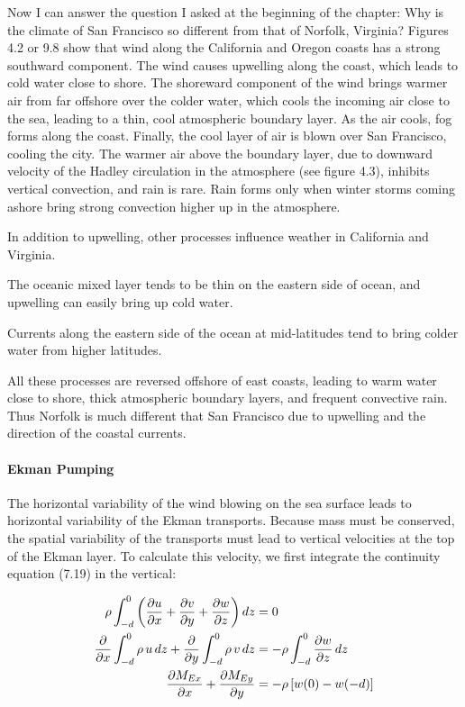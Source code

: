Now I can answer the question I asked at the beginning of the chapter:
Why is the climate of San Francisco so different from that of Norfolk,
Virginia?  Figures 4.2 or 9.8 show that wind along the California and
Oregon coasts has a strong southward component. The wind causes
upwelling along the coast, which leads to
cold water close to shore. The shoreward component of the wind brings
warmer air from far offshore over the colder water, which cools the
incoming air close to the sea, leading to a thin, cool atmospheric
boundary layer. As the air cools, fog forms along the coast. Finally,
the cool layer of air is blown over San Francisco, cooling the
city. The warmer air above the boundary layer, due to downward
velocity of the Hadley circulation in the atmosphere (see figure 4.3),
inhibits vertical convection, and rain is rare. Rain forms only when
winter storms coming ashore bring strong convection higher up in the
atmosphere.

In addition to upwelling, other processes
influence weather in California and Virginia.
\begin{enumerate}
\vitem The oceanic mixed layer
tends to be thin on the eastern side of ocean, and upwelling can
easily bring up cold water.

\vitem Currents along the eastern side of the ocean at mid-latitudes
tend to bring colder water from higher latitudes.
\end{enumerate}
All these processes are reversed offshore of east coasts, leading to
warm water close to shore, thick atmospheric boundary layers, and
frequent convective rain. Thus Norfolk is much different that San
Francisco due to upwelling and the direction
of the coastal currents.

\paragraph{Ekman Pumping}
The horizontal variability of the wind blowing
on the sea surface leads to horizontal variability of the Ekman
transports. Because mass must be conserved, the spatial variability of
the transports must lead to vertical velocities at the top of the
Ekman layer. To calculate this velocity, we first integrate the
continuity equation (7.19) in the vertical:

\begin{equation}
\begin{aligned}
\rho\int_{-d}^0 \left( \frac{\partial{u}}{\partial{x}}+\frac{\partial{v}}{\partial{y}}+\frac{\partial{w}}{\partial{z}} \right) dz &=0
\notag
\\
\frac{\partial}{\partial{x}}\int_{-d}^0 \rho\,u\,dz +\frac{\partial}{\partial{y}}\int_{-d}^0\rho\,v\,dz
&=- \rho \int_{-d}^0 \frac{\partial{w}}{\partial{z}}\, dz
\notag \\
\frac{\partial{M_{Ex}}}{\partial{x}}+\frac{\partial{M_{Ey}}}{\partial{y}} &=-\rho \left[ w(0)-w(-d)\right]
\end{aligned}
\end{equation}

